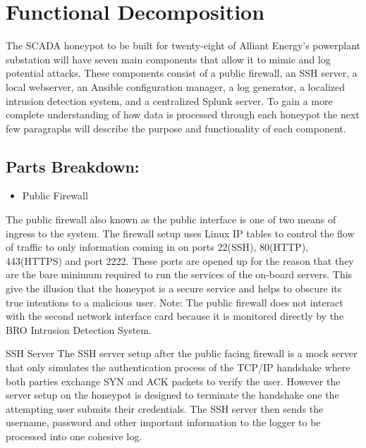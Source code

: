 \section{Functional Decomposition}

The SCADA honeypot to be built for twenty-eight of Alliant Energy's powerplant substation will have seven main components that allow it to mimic and log potential attacks.  These components consist of a public firewall, an SSH server, a local webserver, an Ansible configuration manager, a log generator, a localized intrusion detection system, and a centralized Splunk server.  To gain a more complete understanding of how data is processed through each honeypot the next few paragraphs will describe the purpose and functionality of each component.

\subsection{Parts Breakdown:}
\begin{itemize}
\item Public Firewall
\end{itemize}
\newline
The public firewall also known as the public interface is one of two means of ingress to the system.  The firewall setup uses Linux IP tables to control the flow of traffic to only information coming in on ports 22(SSH), 80(HTTP), 443(HTTPS) and port 2222.  These ports are opened up for the reason that they are the bare minimum required to run the services of the on-board servers.  This give the illusion that the honeypot is a secure service and helps to obscure its true intentions to a malicious user.  Note: The public firewall does not interact with the second network interface card because it is monitored directly by the BRO Intrusion Detection System.

\item SSH Server
\newline
The SSH server setup after the public facing firewall is a mock server that only simulates the authentication process of the TCP/IP handshake where both parties exchange SYN and ACK packets to verify the user.  However the server setup on the honeypot is designed to terminate the handshake one the attempting user submits their credentials.  The SSH server then sends the username, password and other important information to the logger to be processed into one cohesive log.

